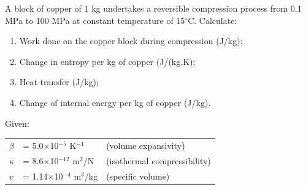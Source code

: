 \begin{MyTutorial}{}
\begin{problem}
  \end{problem}
%
  \begin{problem}\label{Chapter:ThermodynamicPropertiesPureFluids:Problem:08}\citep{Borgnakke_Book} %
    A block of copper of 1 kg undertakes a reversible compression process from 0.1 MPa to 100 MPa at constant temperature of 15$^{\circ}$C. Calculate:
     \begin{enumerate}
       \item Work done on the copper block during compression (J/kg);
       \item Change in entropy per kg of copper (J/(kg.K);
       \item Heat transfer (J/kg);
       \item Change of internal energy per kg of copper (J/kg).
     \end{enumerate}
     Given: \\
       \begin{tabular}{l l l}
         $\beta$   & = 5.0$\times$10$^{-5}$   K$^{-1}$   & (volume expansivity) \\
         $\kappa$  & = 8.6$\times$10$^{-12}$  m$^{2}$/N  & (isothermal compressibility) \\
         $v$       & = 1.14$\times$10$^{-4}$  m$^{3}$/kg & (specific volume)
       \end{tabular}
  \end{problem}
%
\end{MyTutorial}
